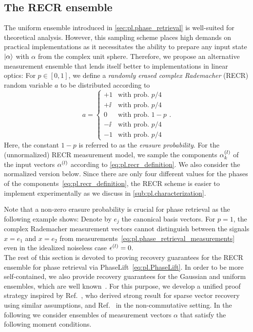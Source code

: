 \subsection{The RECR ensemble}%
\label{sub:pl.recr}

The uniform ensemble introduced in \cref{sec:pl.phase_retrieval} is well-suited for theoretical analysis.
However, this sampling scheme places high demands on practical implementations as it necessitates the ability to prepare any input state $\ket{\alpha}$ with $\alpha$ from the complex unit sphere.
Therefore, we propose an alternative measurement ensemble that lends itself better to implementations in linear optics:
For $p \in [0,1]$, we define a \emph{randomly erased complex Rademacher} (RECR) random variable $a$ to be distributed according to
\[
  a =
  \begin{cases}
    +1 & \textrm{with prob. } p/4 \\
    +\ii & \textrm{with prob. } p/4 \\
    0 & \textrm{with prob. } 1-p \\
    -\ii & \textrm{with prob. } p/4 \\
    -1 & \textrm{with prob. } p/4
  \end{cases}.
  \label{eq:pl.recr_definition}
\]
Here, the constant $1 - p$ is referred to as the \emph{erasure probability}.
For the (unnormalized) RECR measurement model, we sample the components $\alpha^{(l)}_k$ of the input vectors $\alpha^{(l)}$ according to \cref{eq:pl.recr_definition}.
We also consider the normalized version below.
Since there are only four different values for the phases of the components~\eqref{eq:pl.recr_definition}, the RECR scheme is easier to implement experimentally as we discuss in \cref{sub:pl.characterization}.

Note that a non-zero erasure probability is crucial for phase retrieval as the following example shows:
Denote by $e_j$ the canonical basis vectors.
For $p=1$, the complex Rademacher measurement vectors cannot distinguish between the signals $x = e_1$ and $x = e_2$ from measurements~\eqref{eq:pl.phase_retrieval_measurements} even in the idealized noiseless case $\epsilon^{(l)} = 0$.\\



The rest of this section is devoted to proving recovery guarantees for the RECR ensemble for phase retrieval via PhaseLift~\eqref{eq:pl.PhaseLift}.
In order to be more self-contained, we also provide recovery guarantees for the Gaussian and uniform ensembles, which are well known~\cite{Candes_2012_Solving,Demanet_2014_Stable}.
For this purpose, we develop a unified proof strategy inspired by Ref.~\cite{Dirksen_2017_On}, who derived strong result for sparse vector recovery using similar assumptions, and Ref.~\cite{Kabanava_2015_Stable} in the non-commutative setting.
In the following we consider ensembles of measurement vectors $\alpha$ that satisfy the following moment conditions.

